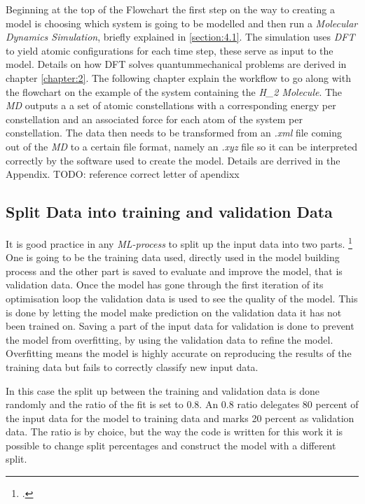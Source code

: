 Beginning at the top of the Flowchart the first step on the way to creating a model is choosing which system is going to be modelled and then run a \textit{Molecular Dynamics Simulation}, briefly explained in \ref{section:4.1}. The simulation uses \textit{DFT} to yield atomic configurations for each time step, these serve as input to the model. Details on how DFT solves quantummechanical problems are derived in chapter \ref{chapter:2}. The following chapter explain the workflow to go along with the flowchart on the example of the system containing the \textit{H_2 Molecule}. The \textit{MD} outputs a a set of atomic constellations with a corresponding energy per constellation and an associated force for each atom of the system per constellation. The data then needs to be transformed from an \textit{.xml} file coming out of the \textit{MD} to a certain file format, namely an \textit{.xyz} file so it can be interpreted correctly by the software used to create the model. Details are derrived in the Appendix. TODO: reference correct letter of apendixx


\subsection{Split Data into training and validation Data}
\label{subsection:4.2.3}

It is good practice in any \textit{ML-process} to split up the input data into two parts.  \footcite[17]{intro-ml} One is going to be the training data used, directly used in the model building process and the other part is saved to evaluate and improve the model, that is validation data. Once the model has gone through the first iteration of its optimisation loop the validation data is used to see the quality of the model. This is  done by letting the model make prediction on the validation data it has not been trained on. Saving a part of the input data for validation is done to prevent the model from overfitting, by using the validation data to refine the model. Overfitting means the model is highly accurate on reproducing the results of the training data but fails to correctly classify new input data.  

In this case the split up between the training and validation data is done randomly and the ratio of the fit is set to $0.8$. An $0.8$ ratio delegates 80 percent of the input data for the model to training data and marks 20 percent as validation data. The ratio is by choice, but the way the code is written for this work it is possible to change split percentages and construct the model with a different split. 

